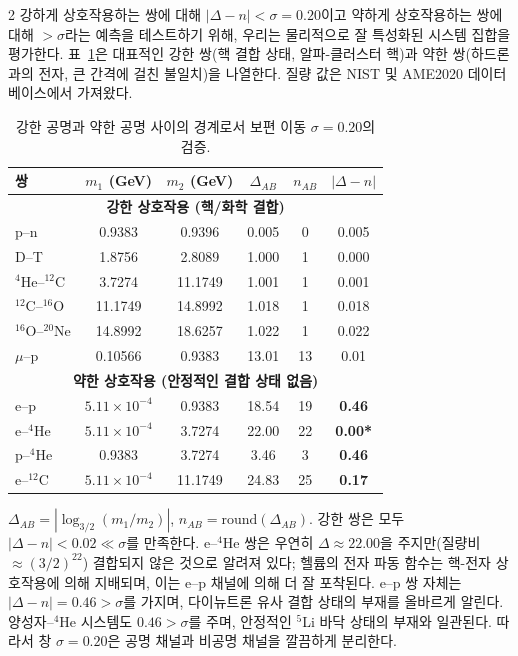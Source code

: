 \documentclass[11pt,a4paper]{article}
\begin{document}
\begin{multicols}{2}
		강하게 상호작용하는 쌍에 대해 $|\Delta - n| < \sigma = 0.20$이고 약하게 상호작용하는 쌍에 대해 $> \sigma$라는 예측을 테스트하기 위해, 우리는 물리적으로 잘 특성화된 시스템 집합을 평가한다. 표~\ref{tab:sigma_validation}은 대표적인 강한 쌍(핵 결합 상태, 알파-클러스터 핵)과 약한 쌍(하드론과의 전자, 큰 간격에 걸친 불일치)을 나열한다. 질량 값은 NIST 및 AME2020 데이터베이스에서 가져왔다.
		
		\begin{table}[H]
			\centering
			\caption{강한 공명과 약한 공명 사이의 경계로서 보편 이동 \(\sigma = 0.20\)의 검증.}
			\label{tab:sigma_validation}
			\small
			\begin{tabular}{l c c c c c}
				\toprule
				쌍 & $m_1$ (GeV) & $m_2$ (GeV) & $\Delta_{AB}$ & $n_{AB}$ & $|\Delta - n|$ \\
				\midrule
				\multicolumn{6}{c}{\textbf{강한 상호작용 (핵/화학 결합)}} \\
				p--n           & 0.9383 & 0.9396 & 0.005  & 0 & 0.005 \\
				D--T           & 1.8756 & 2.8089 & 1.000  & 1 & 0.000 \\
				$^4$He--$^{12}$C  & 3.7274 & 11.1749 & 1.001  & 1 & 0.001 \\
				$^{12}$C--$^{16}$O & 11.1749& 14.8992 & 1.018  & 1 & 0.018 \\
				$^{16}$O--$^{20}$Ne& 14.8992& 18.6257 & 1.022  & 1 & 0.022 \\
				$\mu$--p        & 0.10566& 0.9383 & 13.01  &13 & 0.01  \\
				\midrule
				\multicolumn{6}{c}{\textbf{약한 상호작용 (안정적인 결합 상태 없음)}} \\
				e--p           & $5.11\times10^{-4}$ & 0.9383 & 18.54 & 19 & \textbf{0.46} \\
				e--$^4$He      & $5.11\times10^{-4}$ & 3.7274 & 22.00 & 22 & \textbf{0.00*} \\
				p--$^4$He      & 0.9383 & 3.7274 & 3.46  & 3  & \textbf{0.46} \\
				e--$^{12}$C    & $5.11\times10^{-4}$ & 11.1749& 24.83 & 25 & \textbf{0.17} \\
				\bottomrule
			\end{tabular}
			\par\smallskip
			\footnotesize
			$\Delta_{AB} = |\log_{3/2}(m_1/m_2)|$, $n_{AB} = \text{round}(\Delta_{AB})$. 강한 쌍은 모두 $|\Delta - n| < 0.02 \ll \sigma$를 만족한다. e--$^4$He 쌍은 우연히 $\Delta \approx 22.00$을 주지만(질량비 $\approx (3/2)^{22}$) 결합되지 않은 것으로 알려져 있다; 헬륨의 전자 파동 함수는 핵-전자 상호작용에 의해 지배되며, 이는 e--p 채널에 의해 더 잘 포착된다. e--p 쌍 자체는 $|\Delta - n| = 0.46 > \sigma$를 가지며, 다이뉴트론 유사 결합 상태의 부재를 올바르게 알린다. 양성자--$^4$He 시스템도 $0.46 > \sigma$를 주며, 안정적인 $^5$Li 바닥 상태의 부재와 일관된다. 따라서 창 $\sigma = 0.20$은 공명 채널과 비공명 채널을 깔끔하게 분리한다.
		\end{table}
		

\end{multicols}
\end{document}
